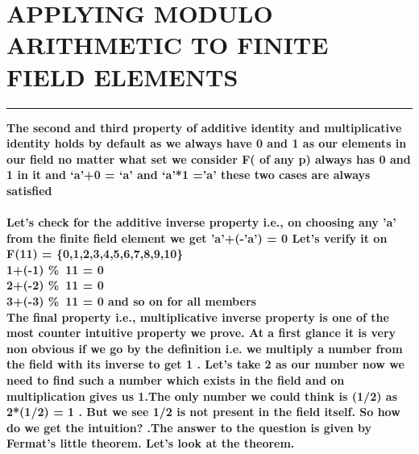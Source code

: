 \documentclass{article}
\begin{document}
\section * {APPLYING MODULO ARITHMETIC TO FINITE FIELD ELEMENTS }
\hrule 
\bigskip 
\textbf{The second and third property of  additive identity and multiplicative identity holds by default as we always have 0 and 1 as our elements in our field no matter what set we consider F( of any p) always has 0 and 1 in it  and ‘a’+0 = ‘a’ and ‘a’*1 =’a’ these two cases are always satisfied}
\\
\\
\textbf{ Let's check for the additive inverse property i.e., on choosing any 'a' from the finite field element we get 'a'+(-'a') = 0 
Let's verify it on F(11) = \{0,1,2,3,4,5,6,7,8,9,10\} 
\\
1+(-1) \%\ 11 = 0 \\
2+(-2) \%\ 11 = 0 \\
3+(-3) \%\ 11 = 0 and so on for all members }
\\
\textbf{The final property i.e., multiplicative inverse property is one of the most counter intuitive property we prove. At a first glance it is very non obvious if we go by the definition i.e. we multiply a number from the field with its inverse to get 1 . Let's take 2 as our number now we need to find such a number which exists in the field and on multiplication gives us 1.The only number we could think is (1/2) as 2*(1/2) = 1 . But we see 1/2 is not present in the field itself. So how do we get the intuition? .The answer to the question is given by Fermat's little theorem. Let's look at the theorem.}
\pagebreak 
\end{document}
